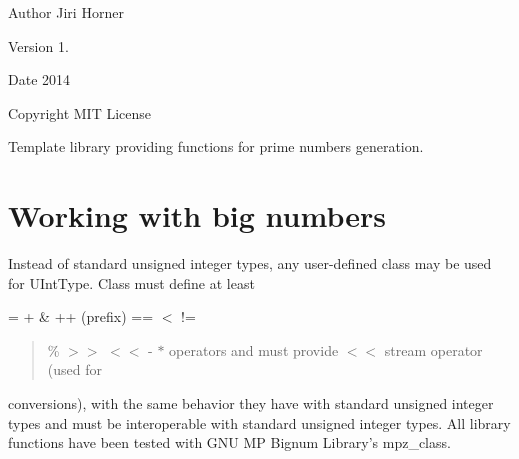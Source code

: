 \begin{DoxyAuthor}{Author}
Jiri Horner
\end{DoxyAuthor}
\begin{DoxyVersion}{Version}
1. 
\end{DoxyVersion}
\begin{DoxyDate}{Date}
2014 
\end{DoxyDate}
\begin{DoxyCopyright}{Copyright}
M\+I\+T License
\end{DoxyCopyright}
Template library providing functions for prime numbers generation.\hypertarget{index_bignums}{}\section{Working with big numbers}\label{index_bignums}
Instead of standard unsigned integer types, any user-\/defined class may be used for {\ttfamily U\+Int\+Type}. Class must define at least {\ttfamily = + \& ++ (prefix) == $<$ != \begin{quote}
\% $>$$>$ $<$$<$ -\/ $\ast$  operators and must provide $<$$<$ stream operator (used for \end{quote}
conversions), with the same behavior they have with standard unsigned integer types and must be interoperable with standard unsigned integer types. All library functions have been tested with G\+N\+U M\+P Bignum Library's {\ttfamily mpz\+\_\+class}. }